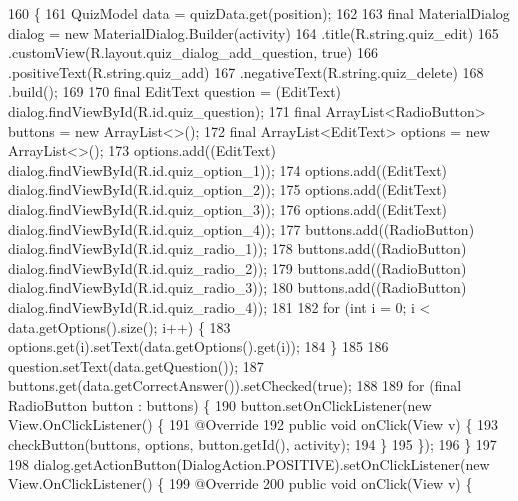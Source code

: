 \begin{DoxyCode}
160                                                                       \{
161         QuizModel data = quizData.get(position);
162 
163         \textcolor{keyword}{final} MaterialDialog dialog = \textcolor{keyword}{new} MaterialDialog.Builder(activity)
164                 .title(R.string.quiz\_edit)
165                 .customView(R.layout.quiz\_dialog\_add\_question, \textcolor{keyword}{true})
166                 .positiveText(R.string.quiz\_add)
167                 .negativeText(R.string.quiz\_delete)
168                 .build();
169 
170         \textcolor{keyword}{final} EditText question = (EditText) dialog.findViewById(R.id.quiz\_question);
171         \textcolor{keyword}{final} ArrayList<RadioButton> buttons = \textcolor{keyword}{new} ArrayList<>();
172         \textcolor{keyword}{final} ArrayList<EditText> options = \textcolor{keyword}{new} ArrayList<>();
173         options.add((EditText) dialog.findViewById(R.id.quiz\_option\_1));
174         options.add((EditText) dialog.findViewById(R.id.quiz\_option\_2));
175         options.add((EditText) dialog.findViewById(R.id.quiz\_option\_3));
176         options.add((EditText) dialog.findViewById(R.id.quiz\_option\_4));
177         buttons.add((RadioButton) dialog.findViewById(R.id.quiz\_radio\_1));
178         buttons.add((RadioButton) dialog.findViewById(R.id.quiz\_radio\_2));
179         buttons.add((RadioButton) dialog.findViewById(R.id.quiz\_radio\_3));
180         buttons.add((RadioButton) dialog.findViewById(R.id.quiz\_radio\_4));
181 
182         \textcolor{keywordflow}{for} (\textcolor{keywordtype}{int} i = 0; i < data.getOptions().size(); i++) \{
183             options.get(i).setText(data.getOptions().get(i));
184         \}
185 
186         question.setText(data.getQuestion());
187         buttons.get(data.getCorrectAnswer()).setChecked(\textcolor{keyword}{true});
188 
189         \textcolor{keywordflow}{for} (\textcolor{keyword}{final} RadioButton button : buttons) \{
190             button.setOnClickListener(\textcolor{keyword}{new} View.OnClickListener() \{
191                 @Override
192                 \textcolor{keyword}{public} \textcolor{keywordtype}{void} onClick(View v) \{
193                     checkButton(buttons, options, button.getId(), activity);
194                 \}
195             \});
196         \}
197 
198         dialog.getActionButton(DialogAction.POSITIVE).setOnClickListener(\textcolor{keyword}{new} View.OnClickListener() \{
199             @Override
200             \textcolor{keyword}{public} \textcolor{keywordtype}{void} onClick(View v) \{

\end{DoxyCode}
